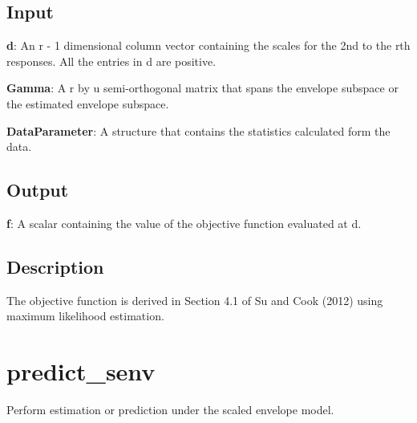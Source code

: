 \documentclass[a4paper,11pt,openany]{memoir}
\begin{document}
\subsection*{Input}

\begin{par}
\textbf{d}: An r - 1 dimensional column vector containing the scales for the 2nd to the rth responses.  All the entries in d are positive.
\end{par} \vspace{1em}
\begin{par}
\textbf{Gamma}: A r by u semi-orthogonal matrix that spans the envelope subspace or the estimated envelope subspace.
\end{par} \vspace{1em}
\begin{par}
\textbf{DataParameter}: A structure that contains the statistics calculated form the data.
\end{par} \vspace{1em}


\subsection*{Output}

\begin{par}
\textbf{f}: A scalar containing the value of the objective function evaluated at d.
\end{par} \vspace{1em}


\subsection*{Description}

\begin{par}
The objective function is derived in Section 4.1 of Su and Cook (2012)  using maximum likelihood estimation.
\end{par} \vspace{1em}


\newpage

    
    
\rmfamily
\color{black}\section{predict\_senv}

\begin{par}
Perform estimation or prediction under the scaled envelope model.
\end{par} \vspace{1em}
\end{document}
